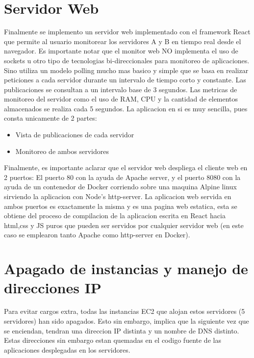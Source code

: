 \documentclass{article}
\begin{document}
\section{Servidor Web}
Finalmente se implemento un servidor web implementado con el 
framework React que permite al usuario monitorear los servidores
A y B en tiempo real desde el navegador.
Es importante notar que el monitor web NO implementa el uso de sockets
u otro tipo de tecnologias bi-direccionales para monitoreo de 
aplicaciones. Sino utiliza un modelo polling mucho mas basico y simple
que se basa en realizar peticiones a cada servidor durante un intervalo
de tiempo corto y constante.
Las publicaciones se consultan a un intervalo base de 3 segundos.
Las metricas de monitoreo del servidor como el uso de RAM, CPU y la
cantidad de elementos almacenados se realiza cada 5 segundos.
La aplicacion en si es muy sencilla, pues consta unicamente de 2 partes:
\begin{itemize}
  \item Vista de publicaciones de cada servidor
  \item Monitoreo de ambos servidores
\end{itemize}
Finalmente, es importante aclarar que el servidor web 
despliega el cliente web en 2 puertos: El puerto 80 con la ayuda
de Apache server, y el puerto 8080 con la ayuda de un 
contenedor de Docker corriendo sobre una maquina Alpine linux 
sirviendo la aplicacion con Node's http-server. La aplicacion web
servida en ambos puertos es exactamente la misma y es una pagina 
web estatica, esta se obtiene del proceso de compilacion 
de la aplicacion escrita en React hacia html,css y JS puros que 
pueden ser servidos por cualquier servidor web (en este caso se
emplearon tanto Apache como http-server en Docker).

\section{Apagado de instancias y manejo de direcciones IP}
Para evitar cargos extra, todas las instancias EC2 que alojan 
estos servidores (5 servidores) han sido apagados. Esto sin embargo, 
implica que la siguiente vez que se enciendan, tendran una 
direccion IP distinta y un nombre de DNS distinto. Estas 
direcciones sin embargo estan quemadas en el codigo fuente de las 
aplicaciones desplegadas en los servidores. 
\end{document}
